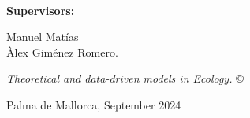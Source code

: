 \documentclass[
	11pt, %
	a4paper, %
]{LegrandOrangeBook}
\begin{document}
\frontmatter %








\thispagestyle{empty} %

~\vfill %
\sffamily

\noindent \textbf{Supervisors:}

\noindent Manuel Matías \\

\noindent Àlex Giménez Romero.

\noindent \textit{Theoretical and data-driven models in Ecology.} \copyright

\noindent Palma de Mallorca, September 2024
\pagebreak


\newpage
\thispagestyle{plain} %
\mbox{}


\newpage
\thispagestyle{plain} %
\mbox{}

\newpage
\thispagestyle{plain} %
\mbox{}



\end{document}
